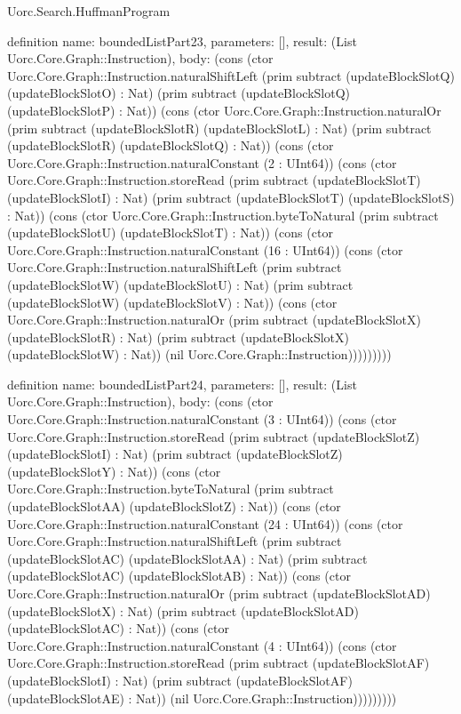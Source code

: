 \begin{lexlean}{Uorc.Search.HuffmanProgram}
\begin{semanticmodule}
definition{
  name: boundedListPart23,
  parameters: [],
  result: (List Uorc.Core.Graph::Instruction),
  body: (cons (ctor Uorc.Core.Graph::Instruction.naturalShiftLeft (prim subtract (updateBlockSlotQ) (updateBlockSlotO) : Nat) (prim subtract (updateBlockSlotQ) (updateBlockSlotP) : Nat)) (cons (ctor Uorc.Core.Graph::Instruction.naturalOr (prim subtract (updateBlockSlotR) (updateBlockSlotL) : Nat) (prim subtract (updateBlockSlotR) (updateBlockSlotQ) : Nat)) (cons (ctor Uorc.Core.Graph::Instruction.naturalConstant (2 : UInt64)) (cons (ctor Uorc.Core.Graph::Instruction.storeRead (prim subtract (updateBlockSlotT) (updateBlockSlotI) : Nat) (prim subtract (updateBlockSlotT) (updateBlockSlotS) : Nat)) (cons (ctor Uorc.Core.Graph::Instruction.byteToNatural (prim subtract (updateBlockSlotU) (updateBlockSlotT) : Nat)) (cons (ctor Uorc.Core.Graph::Instruction.naturalConstant (16 : UInt64)) (cons (ctor Uorc.Core.Graph::Instruction.naturalShiftLeft (prim subtract (updateBlockSlotW) (updateBlockSlotU) : Nat) (prim subtract (updateBlockSlotW) (updateBlockSlotV) : Nat)) (cons (ctor Uorc.Core.Graph::Instruction.naturalOr (prim subtract (updateBlockSlotX) (updateBlockSlotR) : Nat) (prim subtract (updateBlockSlotX) (updateBlockSlotW) : Nat)) (nil Uorc.Core.Graph::Instruction)))))))))
}

definition{
  name: boundedListPart24,
  parameters: [],
  result: (List Uorc.Core.Graph::Instruction),
  body: (cons (ctor Uorc.Core.Graph::Instruction.naturalConstant (3 : UInt64)) (cons (ctor Uorc.Core.Graph::Instruction.storeRead (prim subtract (updateBlockSlotZ) (updateBlockSlotI) : Nat) (prim subtract (updateBlockSlotZ) (updateBlockSlotY) : Nat)) (cons (ctor Uorc.Core.Graph::Instruction.byteToNatural (prim subtract (updateBlockSlotAA) (updateBlockSlotZ) : Nat)) (cons (ctor Uorc.Core.Graph::Instruction.naturalConstant (24 : UInt64)) (cons (ctor Uorc.Core.Graph::Instruction.naturalShiftLeft (prim subtract (updateBlockSlotAC) (updateBlockSlotAA) : Nat) (prim subtract (updateBlockSlotAC) (updateBlockSlotAB) : Nat)) (cons (ctor Uorc.Core.Graph::Instruction.naturalOr (prim subtract (updateBlockSlotAD) (updateBlockSlotX) : Nat) (prim subtract (updateBlockSlotAD) (updateBlockSlotAC) : Nat)) (cons (ctor Uorc.Core.Graph::Instruction.naturalConstant (4 : UInt64)) (cons (ctor Uorc.Core.Graph::Instruction.storeRead (prim subtract (updateBlockSlotAF) (updateBlockSlotI) : Nat) (prim subtract (updateBlockSlotAF) (updateBlockSlotAE) : Nat)) (nil Uorc.Core.Graph::Instruction)))))))))
}


\end{semanticmodule}
\end{lexlean}

